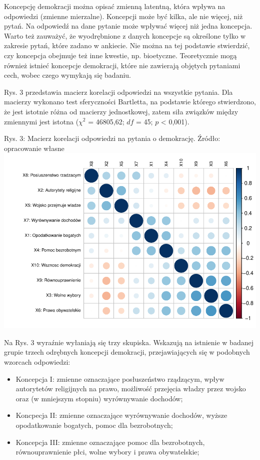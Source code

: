\documentclass[12pt]{article}
\providecommand{\tightlist}{%
  \setlength{\itemsep}{0pt}\setlength{\parskip}{0pt}}
\begin{document}
Koncepcję demokracji można opisać zmienną latentną, która wpływa na odpowiedzi (zmienne mierzalne). Koncepcji może być kilka, ale nie więcej, niż pytań. Na odpowiedź na dane pytanie może wpływać więcej niż jedna koncepcja. Warto też zauważyć, że wyodrębnione z danych koncepcje są określone tylko w zakresie pytań, które zadano w ankiecie. Nie można na tej podstawie stwierdzić, czy koncepcja obejmuje też inne kwestie, np. bioetyczne. Teoretycznie mogą również istnieć koncepcje demokracji, które nie zawierają objętych pytaniami cech, wobec czego wymykają się badaniu.

Rys. 3 przedstawia macierz korelacji odpowiedzi na wszystkie pytania. Dla macierzy wykonano test sferyczności Bartletta, na podstawie którego stwierdzono, że jest istotnie różna od macierzy jednostkowej, zatem siła związków między zmiennymi jest istotna (\(\chi^2\) = 46805,62; \(df\) = 45; \(p\) \textless{} 0,001).

Rys. 3: Macierz korelacji odpowiedzi na pytania o demokrację. Źródło: opracowanie własne
\includegraphics{text_ASA_files/figure-latex/cor-matrix-1.pdf}

Na Rys. 3 wyraźnie wyłaniają się trzy skupiska. Wskazują na istnienie w badanej grupie trzech odrębnych koncepcji demokracji, przejawiających się w podobnych wzorcach odpowiedzi:

\begin{itemize}
\tightlist
\item
  Koncepcja I: zmienne oznaczające posłuszeństwo rządzącym, wpływ autorytetów religijnych na prawo, możliwość przejęcia władzy przez wojsko oraz (w mniejszym stopniu) wyrównywanie dochodów;
\item
  Koncpecja II: zmienne oznaczające wyrównywanie dochodów, wyższe opodatkowanie bogatych, pomoc dla bezrobotnych;
\item
  Koncepcja III: zmienne oznaczające pomoc dla bezrobotnych, równouprawnienie płci, wolne wybory i prawa obywatelskie;
\end{itemize}
\end{document}
